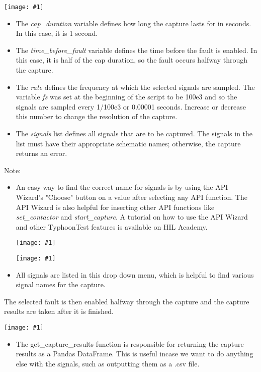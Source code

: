 \documentclass{article}
\newcommand{\centerimage}[2]{%
    \begin{center}
        \centerline{\texttt{[image: \#1]}}
    \end{center}%
}
\begin{document}
\centerimage{capturesignals.png}{7cm}

\begin{itemize}
    \item The \textit{cap\_duration} variable defines how long the capture lasts for in seconds. In this case, it is 1 second.
    
    \item The \textit{time\_before\_fault} variable defines the time before the fault is enabled. In this case, it is half of the cap duration, so the fault occurs halfway through the capture. 
    
    \item The \textit{rate} defines the frequency at which the selected signals are sampled. The variable \textit{fs} was set at the beginning of the script to be 100e3 and so the signals are sampled every 1/100e3 or 0.00001 seconds. Increase or decrease this number to change the resolution of the capture.
    
    \item The \textit{signals} list defines all signals that are to be captured. The signals in the list must have their appropriate schematic  names; otherwise, the capture returns an error.
    
\end{itemize}
Note: 
\begin{itemize}
    \item An easy way to find the correct name for signals is by using the API Wizard's "Choose" button on a value after selecting any API function. The API Wizard is also helpful for inserting other API functions like \textit{set\_contactor} and \textit{start\_capture}. A tutorial on how to use the API Wizard and other TyphoonTest features is available on HIL Academy. 
\centerimage{choose.png}{10cm}
\centerimage{signaldropdown.png}{7cm}
    \item All signals are listed in this drop down menu, which is helpful to find various signal names for the capture.
\end{itemize}

The selected fault is then enabled halfway through the capture and the capture results are taken after it is finished.

\centerimage{faultenable.png}{3cm}

\begin{itemize}
    \item The get\_capture\_results function is responsible for returning the capture results as a Pandas DataFrame. This is useful incase we want to do anything else with the signals, such as outputting them as a .csv file.
\end{itemize}
\end{document}
